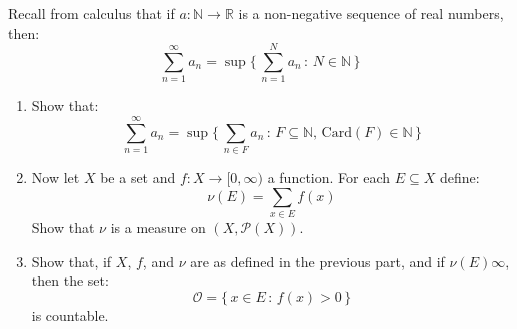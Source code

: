 \documentclass[crop=false,class=article]{standalone}                           %
\begin{document}
    \begin{problem}
        Recall from calculus that if $a:\mathbb{N}\rightarrow\mathbb{R}$ is a
        non-negative sequence of real numbers, then:
        \begin{equation}
            \sum_{n=1}^{\infty}a_{n}
                =\sup\Big\{\,\sum_{n=1}^{N}a_{n}\,:\,N\in\mathbb{N}\,\Big\}
        \end{equation}
        \begin{enumerate}
            \item   Show that:
                    \begin{equation}
                        \sum_{n=1}^{\infty}a_{n}
                        =\sup\Big\{\,\sum_{n\in{F}}a_{n}\,:\,
                            F\subseteq\mathbb{N},\,
                            \textrm{Card}(F)\in\mathbb{N}\,
                        \Big\}
                    \end{equation}
            \item   Now let $X$ be a set and $f:X\rightarrow[0,\infty)$ a
                    function. For each $E\subseteq{X}$ define:
                    \begin{equation}
                        \nu(E)=\sum_{x\in{E}}f(x)
                    \end{equation}
                    Show that $\nu$ is a measure on $(X,\mathcal{P}(X))$.
            \item   Show that, if $X$, $f$, and $\nu$ are as defined in the
                    previous part, and if $\nu(E)\infty$, then the set:
                    \begin{equation}
                        \mathcal{O}=\{\,x\in{E}\,:\,f(x)>0\,\}
                    \end{equation}
                    is countable.
        \end{enumerate}
    \end{problem}
\end{document}
